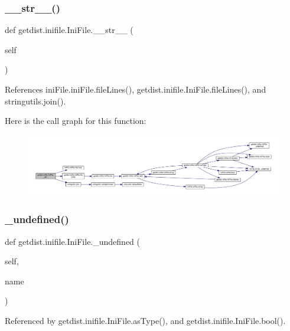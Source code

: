 \subsubsection{\texorpdfstring{\+\_\+\+\_\+str\+\_\+\+\_\+()}{\_\_str\_\_()}}
{\footnotesize\ttfamily def getdist.\+inifile.\+Ini\+File.\+\_\+\+\_\+str\+\_\+\+\_\+ (\begin{DoxyParamCaption}\item[{}]{self }\end{DoxyParamCaption})}



References ini\+File.\+ini\+File.\+file\+Lines(), getdist.\+inifile.\+Ini\+File.\+file\+Lines(), and stringutils.\+join().

Here is the call graph for this function\+:
\nopagebreak
\begin{figure}[H]
\begin{center}
\leavevmode
\includegraphics[width=350pt]{classgetdist_1_1inifile_1_1IniFile_abeb83c5ee7c427d7d0aff5524450d539_cgraph}
\end{center}
\end{figure}
\mbox{\label{classgetdist_1_1inifile_1_1IniFile_acf53cc236a011dff4c0dc416cd7fdd1c}} 
\subsubsection{\texorpdfstring{\+\_\+undefined()}{\_undefined()}}
{\footnotesize\ttfamily def getdist.\+inifile.\+Ini\+File.\+\_\+undefined (\begin{DoxyParamCaption}\item[{}]{self,  }\item[{}]{name }\end{DoxyParamCaption})\hspace{0.3cm}{\ttfamily [private]}}



Referenced by getdist.\+inifile.\+Ini\+File.\+as\+Type(), and getdist.\+inifile.\+Ini\+File.\+bool().

